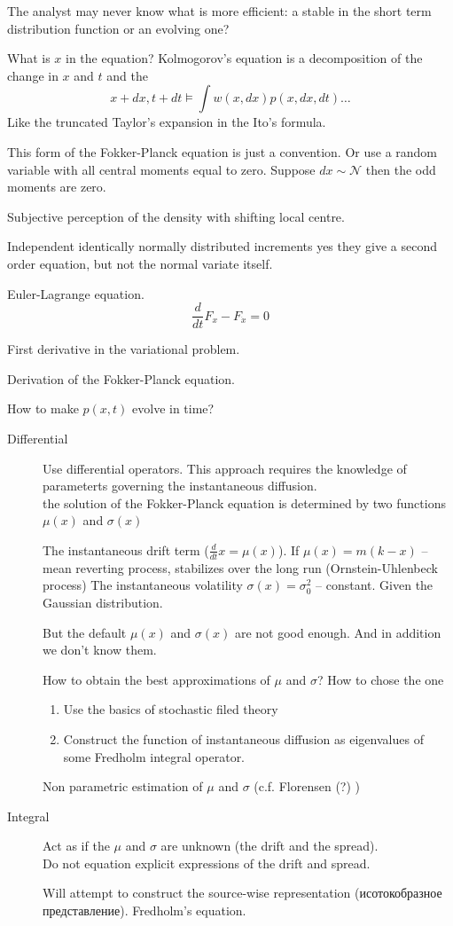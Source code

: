 \documentclass[a4paper]{article}
\newcommand{\rus}[1]{\foreignlanguage{russian}{#1}}
\begin{document}
The analyst may never know what is more efficient: a stable in the short term distribution function or an evolving one?

What is $x$ in the equation? Kolmogorov's equation is a decomposition of the change in $x$ and $t$ and the
\[x+dx, t+dt \models \int w(x,dx) p(x, dx, dt )\ldots \]
Like the truncated Taylor's expansion in the Ito's formula.

This form of the Fokker-Planck equation is just a convention.
Or use a random variable with all central moments equal to zero.
Suppose $dx \sim \mathcal{N}$ then the odd moments are zero.


Subjective perception of the density with shifting local centre.


Independent identically normally distributed increments yes they give a second order equation, but not the normal variate itself.

Euler-Lagrange equation. \[\frac{d }{dt}F_x - F_{\dot{x}} = 0\]

First derivative in the variational problem.

Derivation of the Fokker-Planck equation.

How to make $p(x,t)$ evolve in time? \begin{description}
	\item[Differential] Use differential operators. This approach requires the knowledge of parameterts governing the instantaneous diffusion.\hfill\\
	the solution of the Fokker-Planck equation is determined by two functions $\mu(x)$ and $\sigma(x)$

	The instantaneous drift term ($\frac{d}{dt} x = \mu(x)$).
	If $\mu(x) = m (k-x)$ -- mean reverting process, stabilizes over the long run (Ornstein-Uhlenbeck process)
	The instantaneous volatility $\sigma(x) = \sigma_0^2$ -- constant. Given the Gaussian distribution.

	But the default $\mu(x)$ and $\sigma(x)$ are not good enough. And in addition we don't know them.

	How to obtain the best approximations of $\mu$ and $\sigma$? How to chose the one 
	\begin{enumerate}
		\item Use the basics of stochastic filed theory
		\item Construct the function of instantaneous diffusion as eigenvalues of some Fredholm integral operator.
	\end{enumerate}

	Non parametric estimation of $\mu$ and $\sigma$	(c.f. Florensen (?) )

	\item[Integral] Act as if the $\mu$ and $\sigma$ are unknown (the drift and the spread). \hfill \\
	Do not equation explicit expressions of the drift and spread.

	Will attempt to construct the source-wise representation (\rus{исотокобразное представление}).
	Fredholm's equation.
	
\end{description}
\end{document}
